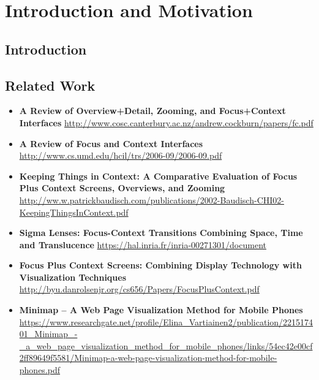 
\chapter{Introduction and Motivation} %

\label{Chapter1} %


\section{Introduction}


\section{Related Work}

\begin{itemize}
    \item \textbf{A Review of Overview+Detail, Zooming, and Focus+Context Interfaces} \url{http://www.cosc.canterbury.ac.nz/andrew.cockburn/papers/fc.pdf}
    \item \textbf{A Review of Focus and Context Interfaces} \url{http://www.cs.umd.edu/hcil/trs/2006-09/2006-09.pdf}
\end{itemize}

\begin{itemize}
    \item \textbf{Keeping Things in Context: A Comparative Evaluation of Focus Plus Context Screens, Overviews, and Zooming } \url{http://ww.w.patrickbaudisch.com/publications/2002-Baudisch-CHI02-KeepingThingsInContext.pdf}
    \item \textbf{Sigma Lenses: Focus-Context Transitions Combining Space, Time and Translucence} \url{https://hal.inria.fr/inria-00271301/document}
    \item \textbf{Focus Plus Context Screens: Combining Display Technology with Visualization Techniques} \url{http://byu.danrolsenjr.org/cs656/Papers/FocusPlusContext.pdf}
    \item \textbf{Minimap – A Web Page Visualization Method for Mobile Phones} \url{https://www.researchgate.net/profile/Elina_Vartiainen2/publication/221517401_Minimap_-_a_web_page_visualization_method_for_mobile_phones/links/54ec42e00cf2ff89649f5581/Minimap-a-web-page-visualization-method-for-mobile-phones.pdf}
\end{itemize}